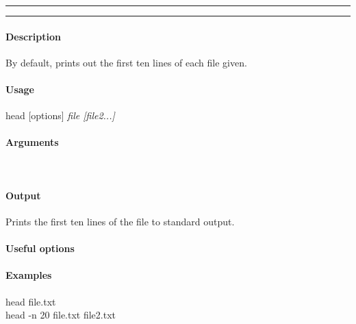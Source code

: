 \hrule
\vspace{1mm}
\hrule
\vspace{4mm}

\paragraph{Description}
\indentpar \raggedright \textrm{By default, prints out the first ten lines of each file given.}\\

\paragraph{Usage}
\indentpar head [options] \textit{file [file2...]}

\paragraph{Arguments}
\indentpar {}\\
\indentpar {}

\paragraph{Output}
\indentpar \textrm{Prints the first ten lines of the file to standard output.}

\paragraph{Useful options}
\indentpar {}


\paragraph{Examples}

\indentpar head file.txt\\
\indentpar head -n 20 file.txt file2.txt

\vspace{20mm}